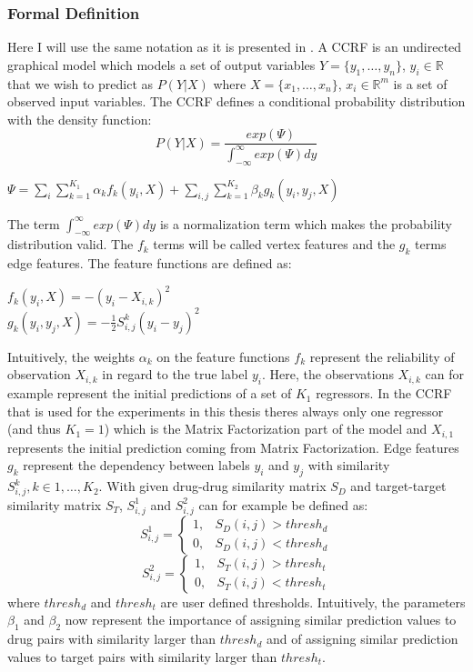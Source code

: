 \subsubsection{Formal Definition}
Here I will use the same notation as it is presented in \cite{baltruvsaitis2013dimensional}. A CCRF is an undirected graphical model which models a set of output variables $Y=\{y_1,\dots,y_n\}$, $y_i \in \mathbb{R}$ that we wish to predict as $P(Y|X)$ where  $X=\{x_1,\dots,x_n\}$, $x_i \in \mathbb{R}^m$ is a set of observed input variables. The CCRF defines a conditional probability distribution with the density function:
\begin{equation}\label{eq:CCRF_main}
P(Y|X)=\frac{exp(\Psi)}{\int_{-\infty}^{\infty} exp(\Psi) dy}
\end{equation}
\begin{center}
$\Psi=\sum_i \sum\limits_{k=1}^{K_1} \alpha_k f_k(y_i, X) + \sum_{i,j} \sum \limits_{k=1}^{K_2} \beta_k g_k (y_i, y_j,X)$
\end{center}
The term $\int_{-\infty}^{\infty} exp(\Psi) dy$ is a normalization term which makes the probability distribution valid. The $f_k$ terms will be called vertex features and the $g_k$ terms edge features. The feature functions are defined as:
\begin{center}
$f_k(y_i,X) = -(y_i - X_{i,k})^2$\\
$g_k(y_i,y_j,X) = -\frac{1}{2}S_{i,j}^k(y_i - y_j)^2$
\end{center}
Intuitively, the weights $\alpha_k$ on the feature functions $f_k$ represent the reliability of observation $X_{i,k}$ in regard to the true label $y_i$. Here, the observations $X_{i,k}$ can for example represent the initial predictions of a set of $K_1$ regressors. In the CCRF that is used for the experiments in this thesis theres always only one regressor (and thus $K_1=1$) which is the Matrix Factorization part of the model and $X_{i,1}$ represents the initial prediction coming from Matrix Factorization.  Edge features $g_k$ represent the dependency between labels $y_i$ and $y_j$ with similarity $S_{i,j}^k, k \in 1,\dots, K_2$. With given drug-drug similarity matrix $S_D$ and target-target similarity matrix $S_T$, $S_{i,j}^1$ and $S_{i,j}^2$ can for example be defined as:
\begin{equation}
\label{simi_1}
S_{i,j}^1 =
\begin{cases}
1, & S_D(i,j) > thresh_d \\
0, & S_D(i,j) < thresh_d
\end{cases} 
\end{equation}
\begin{equation}
\label{simi_2}
S_{i,j}^2 =
\begin{cases}
1, & S_T(i,j) > thresh_t \\
0, & S_T(i,j) < thresh_t
\end{cases} 
\end{equation}
where $thresh_d$ and $thresh_t$ are user defined thresholds. Intuitively, the parameters $\beta_1$ and $\beta_2$ now represent the importance of assigning similar prediction values to drug pairs with similarity larger than $thresh_d$ and of assigning similar prediction values to target pairs with similarity larger than $thresh_t$.

